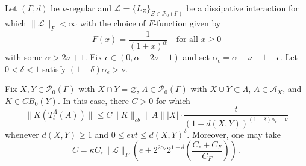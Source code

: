 \documentclass[10pt,a4paper]{amsart}
\let\emptyset\varnothing
\numberwithin{equation}{section}
\begin{document}
\begin{thm}\label{thm:poly_dec_lrb}
Let $(\Gamma, d)$ be $\nu$-regular and $\mathscr{L} = \{L_Z \}_{Z \in \mathcal{P}_0(\Gamma)}$ be a dissipative interaction for which
$\| \mathscr{L} \|_F< \infty$ with the choice of $F$-function given by
\begin{equation} \label{power_law_F}
F(x) = \frac{1}{(1+x)^{\alpha}} \quad \mbox{for all } x \geq 0
\end{equation}
with some $\alpha > 2\nu +1$. Fix $\epsilon \in (0, \alpha - 2 \nu -1)$ and set $\alpha_{\epsilon} = \alpha - \nu - 1- \epsilon$.
Let $0 < \delta < 1$ satisfy $(1- \delta)\alpha_{\epsilon} > \nu$. 

Fix $X,Y \in \mathcal{P}_0(\Gamma)$ with $X \cap Y = \emptyset$, $\Lambda \in \mathcal{P}_0( \Gamma)$ with $X \cup Y \subset \Lambda$, 
$A \in \mathcal{A}_X$, and $K\in CB_0(Y)$. In this case, there $C>0$ for which 
\begin{equation} \label{power_law_lrb}
\| K (T^{\Lambda}_t(A)) \| \leq  C \| K \|_{cb} \| A \| |X| \cdot \frac{t}{(1+ d(X,Y))^{(1- \delta) \alpha_{\epsilon} - \nu}}
\end{equation}
whenever $d(X,Y) \geq 1$ and $0 \leq evt \leq d(X,Y)^{\delta}$. Moreover, one may take
\begin{equation} \label{constant} 
C =  \kappa C_{\epsilon} \| \mathscr{L} \|_F  \left( e + 2^{2\alpha_{\epsilon}} 2^{1- \delta} \left( \frac{C_{\epsilon} + C_F}{C_F} \right) \right) \, .
\end{equation}
\end{thm}
\end{document}
